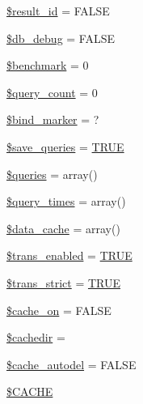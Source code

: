 \begin{DoxyCompactItemize}
\item 
\mbox{\hyperlink{class_c_i___d_b__driver_a0ebacb40e3b6f8bf33d3de0f2cc71474}{\$result\+\_\+id}} = F\+A\+L\+SE
\item 
\mbox{\hyperlink{class_c_i___d_b__driver_a2c1bc80cc98589e419a6c535e53735de}{\$db\+\_\+debug}} = F\+A\+L\+SE
\item 
\mbox{\hyperlink{class_c_i___d_b__driver_ac75dbf878e2ceec25d2abe6730855f6b}{\$benchmark}} = 0
\item 
\mbox{\hyperlink{class_c_i___d_b__driver_aa7f7fc5b08bc2c3626ea7065d50c8847}{\$query\+\_\+count}} = 0
\item 
\mbox{\hyperlink{class_c_i___d_b__driver_a253af4ebf23051f23690926079f4285d}{\$bind\+\_\+marker}} = \textquotesingle{}?\textquotesingle{}
\item 
\mbox{\hyperlink{class_c_i___d_b__driver_a083a278ea2075824db1db85edaa8e0a8}{\$save\+\_\+queries}} = \mbox{\hyperlink{constants_8php_ae04a3efe6aa42044f803ee90c2277846}{T\+R\+UE}}
\item 
\mbox{\hyperlink{class_c_i___d_b__driver_a576b05de2f452e4cce4e3de12667ba0f}{\$queries}} = array()
\item 
\mbox{\hyperlink{class_c_i___d_b__driver_a060b2893433dfc037803cf6541420f5f}{\$query\+\_\+times}} = array()
\item 
\mbox{\hyperlink{class_c_i___d_b__driver_aab3007e30adbaf71d06218aa6c90e384}{\$data\+\_\+cache}} = array()
\item 
\mbox{\hyperlink{class_c_i___d_b__driver_a450683d6d87929985766484b2f6a9e7b}{\$trans\+\_\+enabled}} = \mbox{\hyperlink{constants_8php_ae04a3efe6aa42044f803ee90c2277846}{T\+R\+UE}}
\item 
\mbox{\hyperlink{class_c_i___d_b__driver_ae3111155f1f3ec59fe667b90dafb179f}{\$trans\+\_\+strict}} = \mbox{\hyperlink{constants_8php_ae04a3efe6aa42044f803ee90c2277846}{T\+R\+UE}}
\item 
\mbox{\hyperlink{class_c_i___d_b__driver_ab29a8930111a4f2a57987a9031982c34}{\$cache\+\_\+on}} = F\+A\+L\+SE
\item 
\mbox{\hyperlink{class_c_i___d_b__driver_a01f61437be9e9a04ee228f5d455265db}{\$cachedir}} = \textquotesingle{}\textquotesingle{}
\item 
\mbox{\hyperlink{class_c_i___d_b__driver_a3da421c22206e24614dc73c9536ff605}{\$cache\+\_\+autodel}} = F\+A\+L\+SE
\item 
\mbox{\hyperlink{class_c_i___d_b__driver_a54f3ab89da1323e5680116d8e9e94b83}{\$\+C\+A\+C\+HE}}
\end{DoxyCompactItemize}
